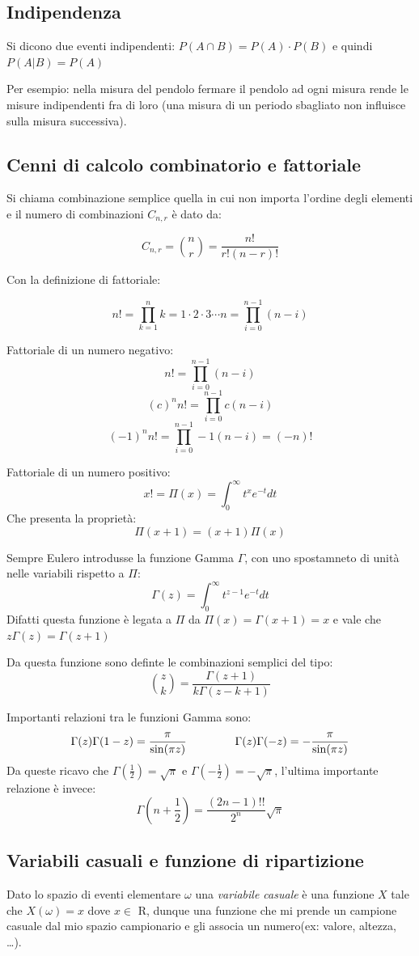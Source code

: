 \documentclass{article}
\theoremstyle{remark}
\begin{document}
\subsection{Indipendenza}
Si dicono due eventi indipendenti: $P(A \cap B)=P(A) \cdot P(B)$ e quindi $P(A|B)=P(A)$ 

Per esempio: nella misura del pendolo fermare il pendolo ad ogni misura rende le misure indipendenti fra di loro (una misura di un periodo sbagliato non influisce sulla misura successiva).

\subsection{Cenni di calcolo combinatorio e fattoriale}
Si chiama combinazione semplice quella in cui non importa l'ordine degli elementi e il numero di combinazioni $C_{n,r}$ è dato da:

\[
C_{n,r} = \binom{n}{r} = \frac{n!}{r!(n - r)!}
\]

Con la definizione di fattoriale:

\[
n! = \prod_{k=1}^{n} k = 1 \cdot 2 \cdot 3 \cdots n = \prod_{i=0}^{n-1} (n - i)
\]

Fattoriale di un numero negativo:
\[
n!=\prod_{i=0}^{n-1}(n-i)
\]
\[
{(c)}^n n!=\prod_{i=0}^{n-1}c(n-i)
\]
\[
{(-1)}^n n!=\prod_{i=0}^{n-1}-1(n-i)=(-n)!
\]

Fattoriale di un numero positivo:
\[
x! = \Pi(x)=\int_{0}^{\infty}t^{x}e^{-t}dt
\]
Che presenta la proprietà:
\[
\Pi(x+1)=(x+1)\Pi(x)
\]

Sempre Eulero introdusse la funzione Gamma $\Gamma$, con uno spostamneto di unità nelle variabili rispetto a $\Pi$:
\[
\Gamma(z)=\int_{0}^{\infty}t^{z-1}e^{-t}dt
\]
Difatti questa funzione è legata a $\Pi$ da $\Pi(x)=\Gamma(x+1)=x\!$ e vale che $z\Gamma(z)=\Gamma(z+1)$

Da questa funzione sono definte le combinazioni semplici del tipo:
\[
\binom{z}{k}=\frac{\Gamma(z+1)}{k\! \Gamma(z-k+1)}
\]

Importanti relazioni tra le funzioni Gamma sono:
\[
\Gamma(z)\Gamma(1-z)=\frac{\pi}{\sin(\pi z)} \hspace{1.5cm} \Gamma(z)\Gamma(-z)=-\frac{\pi}{\sin(\pi z)}
\]
Da queste ricavo che $\Gamma(\frac{1}{2})=\sqrt{\pi}$ e $\Gamma(-\frac{1}{2})=-\sqrt{\pi}$, l'ultima importante relazione è invece:
\[
\Gamma(n+\frac{1}{2})=\frac{(2n-1)!!}{2^n}\sqrt{\pi}
\]



\subsection{Variabili casuali e funzione di ripartizione}
Dato lo spazio di eventi elementare $\omega$ una \textit{variabile casuale} è una funzione $X$ tale che $X(\omega)=x$ dove $x\in$ R,
dunque una funzione che mi prende un campione casuale dal mio spazio campionario e gli associa un numero(ex: valore, altezza, \ldots).
\end{document}
